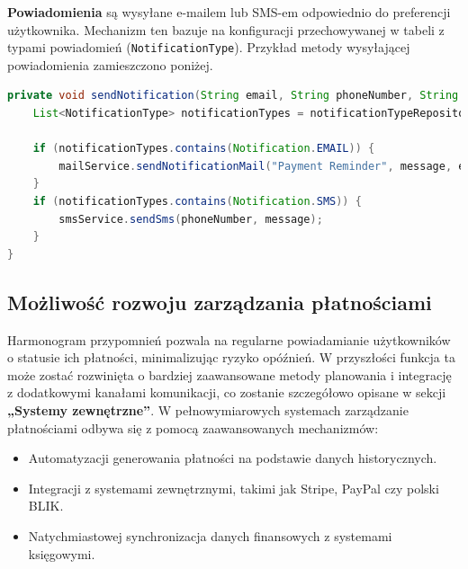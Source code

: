 \noindent \textbf{Powiadomienia} są wysyłane e-mailem lub SMS-em odpowiednio do preferencji użytkownika. Mechanizm ten bazuje na konfiguracji przechowywanej w tabeli z typami powiadomień (\texttt{NotificationType}).
Przykład metody wysyłającej powiadomienia zamieszczono poniżej.
\begin{lstlisting}[language=Java, style=JavaStyle, caption=Wysyłanie powiadomień]
private void sendNotification(String email, String phoneNumber, String message) {
    List<NotificationType> notificationTypes = notificationTypeRepository.findByUserEmail(email);

    if (notificationTypes.contains(Notification.EMAIL)) {
        mailService.sendNotificationMail("Payment Reminder", message, email);
    }
    if (notificationTypes.contains(Notification.SMS)) {
        smsService.sendSms(phoneNumber, message);
    }
}
\end{lstlisting}

\subsection{Możliwość rozwoju zarządzania płatnościami}
Harmonogram przypomnień pozwala na regularne powiadamianie użytkowników o statusie ich płatności, minimalizując ryzyko opóźnień. W przyszłości funkcja ta może zostać rozwinięta o bardziej zaawansowane metody planowania i integrację z dodatkowymi kanałami komunikacji, co zostanie szczegółowo opisane w sekcji \textbf{„Systemy zewnętrzne”}. W pełnowymiarowych systemach zarządzanie płatnościami odbywa się z pomocą zaawansowanych mechanizmów:
\begin{itemize}
    \item Automatyzacji generowania płatności na podstawie danych historycznych.
    \item Integracji z systemami zewnętrznymi, takimi jak Stripe, PayPal czy polski BLIK.
    \item Natychmiastowej synchronizacja danych finansowych z systemami księgowymi.
\end{itemize}



